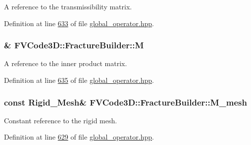 A reference to the transmissibility matrix. 



Definition at line \hyperlink{global__operator_8hpp_source_l00633}{633} of file \hyperlink{global__operator_8hpp_source}{global\+\_\+operator.\+hpp}.

\subsubsection[{\texorpdfstring{M}{M}}]{\& F\+V\+Code3\+D\+::\+Fracture\+Builder\+::M\hspace{0.3cm}{\ttfamily [private]}}\hypertarget{classFVCode3D_1_1FractureBuilder_a24d025a1ca7ca61edeec47be5b049a52}{}\label{classFVCode3D_1_1FractureBuilder_a24d025a1ca7ca61edeec47be5b049a52}


A reference to the inner product matrix. 



Definition at line \hyperlink{global__operator_8hpp_source_l00635}{635} of file \hyperlink{global__operator_8hpp_source}{global\+\_\+operator.\+hpp}.

\subsubsection[{\texorpdfstring{M\+\_\+mesh}{M_mesh}}]{\setlength{\rightskip}{0pt plus 5cm}const {\bf Rigid\+\_\+\+Mesh}\& F\+V\+Code3\+D\+::\+Fracture\+Builder\+::\+M\+\_\+mesh\hspace{0.3cm}{\ttfamily [private]}}\hypertarget{classFVCode3D_1_1FractureBuilder_a1d94459249cc414f162853509755fa3a}{}\label{classFVCode3D_1_1FractureBuilder_a1d94459249cc414f162853509755fa3a}


Constant reference to the rigid mesh. 



Definition at line \hyperlink{global__operator_8hpp_source_l00629}{629} of file \hyperlink{global__operator_8hpp_source}{global\+\_\+operator.\+hpp}.

